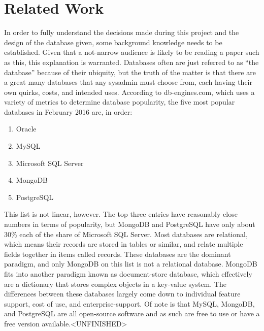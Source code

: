 \documentclass[runningheads,a4paper]{llncs}
\begin{document}
\section{Related Work}\label{sec:related}
In order to fully understand the decisions made during this project and the design of the database given, some background knowledge needs to be established. Given that a not-narrow audience is likely to be reading a paper such as this, this explanation is warranted. Databases often are just referred to as ``the database'' because of their ubiquity, but the truth of the matter is that there are a great many databases that any sysadmin must choose from, each having their own quirks, costs, and intended uses. According to db-engines.com, which uses a variety of metrics to determine database popularity, the five most popular databases in February 2016\cite{db-engine} are, in order:
\begin{enumerate}
\item Oracle
\item MySQL
\item Microsoft SQL Server
\item MongoDB
\item PostgreSQL
\end{enumerate}
This list is not linear, however. The top three entries have reasonably close numbers in terms of popularity, but MongoDB and PostgreSQL have only about 30\% each of the share of Microsoft SQL Server. Most databases are relational, which means their records are stored in tables or similar, and relate multiple fields together in items called records. These databases are the dominant paradigm, and only MongoDB on this list is not a relational database. MongoDB fits into another paradigm known as document-store database, which effectively are a dictionary that stores complex objects in a key-value system. The differences between these databases largely come down to individual feature support, cost of use, and enterprise-support. Of note is that MySQL, MongoDB, and PostgreSQL are all open-source software and as such are free to use or have a free version available.<UNFINISHED>

\end{document}
